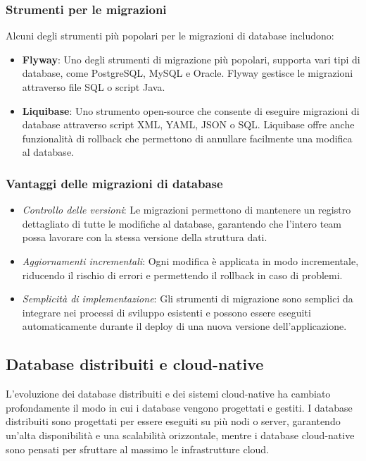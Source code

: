 \subsubsection{Strumenti per le migrazioni}
Alcuni degli strumenti più popolari per le migrazioni di database includono:
\begin{itemize}
    \item \textbf{Flyway}: Uno degli strumenti di migrazione più popolari, supporta vari tipi di database, come PostgreSQL, MySQL e Oracle. Flyway gestisce le migrazioni attraverso file SQL o script Java.
    \item \textbf{Liquibase}: Uno strumento open-source che consente di eseguire migrazioni di database attraverso script XML, YAML, JSON o SQL. Liquibase offre anche funzionalità di rollback che permettono di annullare facilmente una modifica al database.
\end{itemize}

\subsubsection{Vantaggi delle migrazioni di database}
\begin{itemize}
    \item \textit{Controllo delle versioni}: Le migrazioni permettono di mantenere un registro dettagliato di tutte le modifiche al database, garantendo che l'intero team possa lavorare con la stessa versione della struttura dati.
    \item \textit{Aggiornamenti incrementali}: Ogni modifica è applicata in modo incrementale, riducendo il rischio di errori e permettendo il rollback in caso di problemi.
    \item \textit{Semplicità di implementazione}: Gli strumenti di migrazione sono semplici da integrare nei processi di sviluppo esistenti e possono essere eseguiti automaticamente durante il deploy di una nuova versione dell'applicazione.
\end{itemize}

\subsection{Database distribuiti e cloud-native}
L'evoluzione dei database distribuiti e dei sistemi cloud-native ha cambiato profondamente il modo in cui i database vengono progettati e gestiti. I database distribuiti sono progettati per essere eseguiti su più nodi o server, garantendo un'alta disponibilità e una scalabilità orizzontale, mentre i database cloud-native sono pensati per sfruttare al massimo le infrastrutture cloud.

